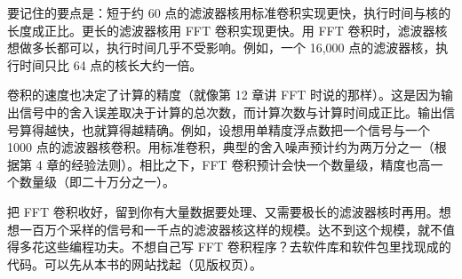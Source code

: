 要记住的要点是：短于约 60
点的滤波器核用标准卷积实现更快，执行时间与核的长度成正比。更长的滤波器核用
FFT 卷积实现更快。用 FFT
卷积时，滤波器核想做多长都可以，执行时间几乎不受影响。例如，一个 16,000
点的滤波器核，执行时间只比 64 点的核长大约一倍。

卷积的速度也决定了计算的精度（就像第 12 章讲 FFT
时说的那样）。这是因为输出信号中的舍入误差取决于计算的总次数，而计算次数与计算时间成正比。输出信号算得越快，也就算得越精确。例如，设想用单精度浮点数把一个信号与一个
1000
点的滤波器核卷积。用标准卷积，典型的舍入噪声预计约为两万分之一（根据第 4
章的经验法则）。相比之下，FFT
卷积预计会快一个数量级，精度也高一个数量级（即二十万分之一）。

把 FFT
卷积收好，留到你有大量数据要处理、又需要极长的滤波器核时再用。想想一百万个采样的信号和一千点的滤波器核这样的规模。达不到这个规模，就不值得多花这些编程功夫。不想自己写
FFT
卷积程序？去软件库和软件包里找现成的代码。可以先从本书的网站找起（见版权页）。

